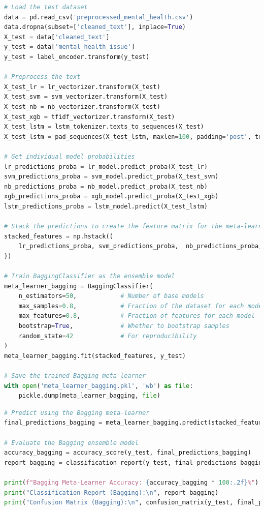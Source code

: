 \begin{tcolorbox}[colback=gray!5!white, colframe=gray!80!black, boxrule=0.5pt, title=Evaluate Bagging Meta-Learner and Ensemble Model 5]
    \begin{lstlisting}[language=Python]
# Load the test dataset
data = pd.read_csv('preprocessed_mental_health.csv')
data.dropna(subset=['cleaned_text'], inplace=True)
X_test = data['cleaned_text']
y_test = data['mental_health_issue']
y_test = label_encoder.transform(y_test)

# Preprocess the text
X_test_lr = lr_vectorizer.transform(X_test)
X_test_svm = svm_vectorizer.transform(X_test)
X_test_nb = nb_vectorizer.transform(X_test)
X_test_xgb = tfidf_vectorizer.transform(X_test)
X_test_lstm = lstm_tokenizer.texts_to_sequences(X_test)
X_test_lstm = pad_sequences(X_test_lstm, maxlen=100, padding='post', truncating='post')

# Get individual model probabilities
lr_predictions_proba = lr_model.predict_proba(X_test_lr)
svm_predictions_proba = svm_model.predict_proba(X_test_svm)
nb_predictions_proba = nb_model.predict_proba(X_test_nb)
xgb_predictions_proba = xgb_model.predict_proba(X_test_xgb)
lstm_predictions_proba = lstm_model.predict(X_test_lstm)

# Stack the predictions to create the feature matrix for the meta-learner
stacked_features = np.hstack((
    lr_predictions_proba, svm_predictions_proba,  nb_predictions_proba, xgb_predictions_proba,  lstm_predictions_proba
))

# Train BaggingClassifier as the ensemble model
meta_learner_bagging = BaggingClassifier(
    n_estimators=50,            # Number of base models
    max_samples=0.8,            # Fraction of the dataset for each model
    max_features=0.8,           # Fraction of features for each model
    bootstrap=True,             # Whether to bootstrap samples
    random_state=42             # For reproducibility
)
meta_learner_bagging.fit(stacked_features, y_test)

# Save the trained Bagging meta-learner
with open('meta_learner_bagging.pkl', 'wb') as file:
    pickle.dump(meta_learner_bagging, file)
\end{lstlisting}
\end{tcolorbox}
\begin{tcolorbox}[colback=gray!5!white, colframe=gray!80!black, boxrule=0.5pt, title=Evaluate Meta-Learner and Ensemble Model 5]
    \begin{lstlisting}[language=Python]
# Predict using the Bagging meta-learner
final_predictions_bagging = meta_learner_bagging.predict(stacked_features)

# Evaluate the Bagging ensemble model
accuracy_bagging = accuracy_score(y_test, final_predictions_bagging)
report_bagging = classification_report(y_test, final_predictions_bagging, target_names=label_encoder.classes_)

print(f"Bagging Meta-Learner Accuracy: {accuracy_bagging * 100:.2f}%")
print("Classification Report (Bagging):\n", report_bagging)
print("Confusion Matrix (Bagging):\n", confusion_matrix(y_test, final_predictions_bagging))
    \end{lstlisting}
\end{tcolorbox}

